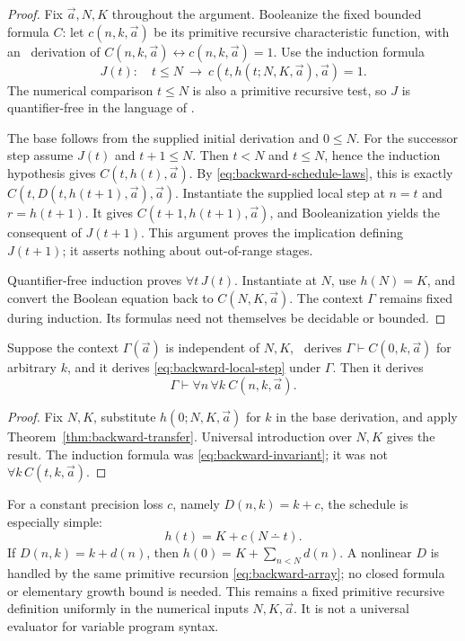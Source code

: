 \begin{proof}
Fix $\vec a,N,K$ throughout the argument.  Booleanize the fixed bounded
formula $C$: let $c(n,k,\vec a)$ be its primitive recursive characteristic
function, with an \ipra\ derivation of
$C(n,k,\vec a)\leftrightarrow c(n,k,\vec a)=1$.
Use the induction formula
\begin{equation}\label{eq:backward-invariant}
 J(t):\quad
 t\le N\ \longrightarrow\ c(t,h(t;N,K,\vec a),\vec a)=1.
\end{equation}
The numerical comparison $t\le N$ is also a primitive recursive test, so
$J$ is quantifier-free in the language of \ipra.

The base follows from the supplied initial derivation and $0\le N$.
For the successor step assume $J(t)$ and $t+1\le N$.  Then $t<N$ and
$t\le N$, hence the induction hypothesis gives $C(t,h(t),\vec a)$.
By \eqref{eq:backward-schedule-laws}, this is exactly
$C(t,D(t,h(t+1),\vec a),\vec a)$.  Instantiate the supplied local step at
$n=t$ and $r=h(t+1)$.  It gives $C(t+1,h(t+1),\vec a)$, and
Booleanization yields the consequent of $J(t+1)$.  This argument proves
the implication defining $J(t+1)$; it asserts nothing about out-of-range
stages.

Quantifier-free induction proves $\forall t\,J(t)$.  Instantiate at $N$,
use $h(N)=K$, and convert the Boolean equation back to $C(N,K,\vec a)$.
The context $\Gamma$ remains fixed during induction.  Its formulas need
not themselves be decidable or bounded.
\end{proof}

\begin{corollary}
\label{cor:observational-induction}
Suppose the context $\Gamma(\vec a)$ is independent of $N,K$, \ipra\
derives $\Gamma\vdash C(0,k,\vec a)$ for arbitrary $k$, and it derives
\eqref{eq:backward-local-step} under $\Gamma$.  Then it derives
\[
       \Gamma\vdash\forall n\,\forall k\ C(n,k,\vec a).
\]
\end{corollary}

\begin{proof}
Fix $N,K$, substitute $h(0;N,K,\vec a)$ for $k$ in the base derivation,
and apply Theorem~\ref{thm:backward-transfer}.  Universal introduction over
$N,K$ gives the result.  The induction formula was
\eqref{eq:backward-invariant}; it was not $\forall k\,C(t,k,\vec a)$.
\end{proof}

For a constant precision loss $c$, namely $D(n,k)=k+c$, the schedule is
especially simple:
\begin{equation}\label{eq:constant-loss-budget}
                  h(t)=K+c(N\dotminus t).
\end{equation}
If $D(n,k)=k+d(n)$, then $h(0)=K+\sum_{n<N}d(n)$.  A nonlinear $D$ is
handled by the same primitive recursion \eqref{eq:backward-array}; no
closed formula or elementary growth bound is needed.  This remains a
fixed primitive recursive definition uniformly in the numerical inputs
$N,K,\vec a$.  It is not a universal evaluator for variable program syntax.

